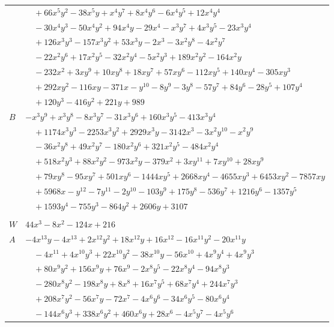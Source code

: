\documentclass[11pt]{article}
\begin{document}
\begin{longtable}{@{}ll@{}}
 & $\quad +66x^{5}y^{2}-38x^{5}y+x^{4}y^{7}+8x^{4}y^{6}-6x^{4}y^{5}+12x^{4}y^{4}$\\
 & $\quad -30x^{4}y^{3}-50x^{4}y^{2}+94x^{4}y-29x^{4}-x^{3}y^{7}+4x^{3}y^{5}-23x^{3}y^{4}$\\
 & $\quad +126x^{3}y^{3}-157x^{3}y^{2}+53x^{3}y-2x^{3}-3x^{2}y^{8}-4x^{2}y^{7}$\\
 & $\quad -22x^{2}y^{6}+17x^{2}y^{5}-32x^{2}y^{4}-5x^{2}y^{3}+189x^{2}y^{2}-164x^{2}y$\\
 & $\quad -232x^{2}+3xy^{9}+10xy^{8}+18xy^{7}+57xy^{6}-112xy^{5}+140xy^{4}-305xy^{3}$\\
 & $\quad +292xy^{2}-116xy-371x-y^{10}-8y^{9}-3y^{8}-57y^{7}+84y^{6}-28y^{5}+107y^{4}$\\
 & $\quad +120y^{3}-416y^{2}+221y+989$\\
$B$ & $-x^{3}y^{9}+x^{3}y^{8}-8x^{3}y^{7}-31x^{3}y^{6}+160x^{3}y^{5}-413x^{3}y^{4}$\\
 & $\quad +1174x^{3}y^{3}-2253x^{3}y^{2}+2929x^{3}y-3142x^{3}-3x^{2}y^{10}-x^{2}y^{9}$\\
 & $\quad -36x^{2}y^{8}+49x^{2}y^{7}-180x^{2}y^{6}+321x^{2}y^{5}-484x^{2}y^{4}$\\
 & $\quad +518x^{2}y^{3}+88x^{2}y^{2}-973x^{2}y-379x^{2}+3xy^{11}+7xy^{10}+28xy^{9}$\\
 & $\quad +79xy^{8}-95xy^{7}+501xy^{6}-1444xy^{5}+2668xy^{4}-4655xy^{3}+6453xy^{2}-7857xy$\\
 & $\quad +5968x-y^{12}-7y^{11}-2y^{10}-103y^{9}+175y^{8}-536y^{7}+1216y^{6}-1357y^{5}$\\
 & $\quad +1593y^{4}-755y^{3}-864y^{2}+2606y+3107$\\
\addlinespace[3pt]
\multicolumn{2}{@{}l}{$i=3$, $m=1$, neighbours $42,2,10,19,20,22,27,29,34,35,36$}\\
$W$ & $44x^{3}-8x^{2}-124x+216$\\
$A$ & $-4x^{13}y-4x^{13}+2x^{12}y^{2}+18x^{12}y+16x^{12}-16x^{11}y^{2}-20x^{11}y$\\
 & $\quad -4x^{11}+4x^{10}y^{3}+22x^{10}y^{2}-38x^{10}y-56x^{10}+4x^{9}y^{4}+4x^{9}y^{3}$\\
 & $\quad +80x^{9}y^{2}+156x^{9}y+76x^{9}-2x^{8}y^{5}-22x^{8}y^{4}-94x^{8}y^{3}$\\
 & $\quad -280x^{8}y^{2}-198x^{8}y+8x^{8}+16x^{7}y^{5}+68x^{7}y^{4}+244x^{7}y^{3}$\\
 & $\quad +208x^{7}y^{2}-56x^{7}y-72x^{7}-4x^{6}y^{6}-34x^{6}y^{5}-80x^{6}y^{4}$\\
 & $\quad -144x^{6}y^{3}+338x^{6}y^{2}+460x^{6}y+28x^{6}-4x^{5}y^{7}-4x^{5}y^{6}$\\

\end{longtable}
\end{document}
